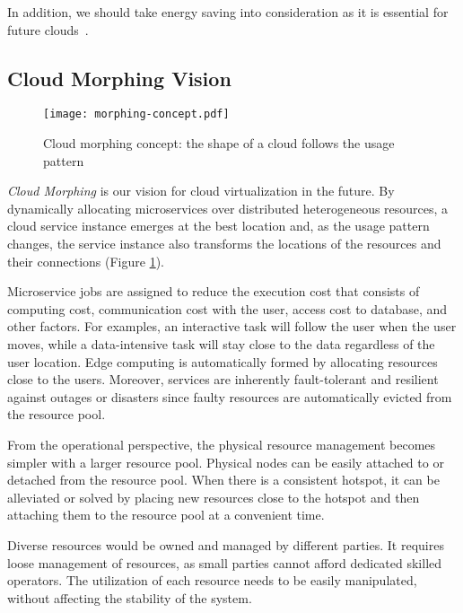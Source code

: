 In addition, we should take energy saving into consideration as it is
essential for future clouds~\cite{Mastelic-2015,masanet2020recalibrating}.

\subsection{Cloud Morphing Vision}

\begin{figure}[tb]
  \begin{center}
    \texttt{[image: morphing-concept.pdf]}
    \vspace{-2.0ex}
    \caption{Cloud morphing concept: the shape of a cloud follows the
      usage pattern}
    \label{fig:concept}
  \end{center}
\end{figure}

{\em Cloud Morphing} is our vision for cloud virtualization in the future.
By dynamically allocating microservices over distributed
heterogeneous resources, a cloud service instance emerges at the best
location and, as the usage pattern changes, the service instance also
transforms the locations of the resources and their connections
(Figure \ref{fig:concept}).

Microservice jobs are assigned to reduce the execution cost that
consists of computing cost, communication cost with the user, access
cost to database, and other factors.
For examples, an interactive task will follow the user when the user
moves, while a data-intensive task will stay close to the data
regardless of the user location.
Edge computing is automatically formed by allocating resources close to
the users.
Moreover, services are inherently fault-tolerant and resilient
against outages or disasters since faulty resources are
automatically evicted from the resource pool.

From the operational perspective, the physical resource management
becomes simpler with a larger resource pool.
Physical nodes can be easily attached to or detached from the resource pool.
When there is a consistent hotspot, it can be alleviated or solved by
placing new resources close to the hotspot and then attaching them to
the resource pool at a convenient time.

Diverse resources would be owned and managed by different parties.
It requires loose management of resources, as small parties cannot
afford dedicated skilled operators.
The utilization of each resource needs to be easily manipulated,
without affecting the stability of the system.

